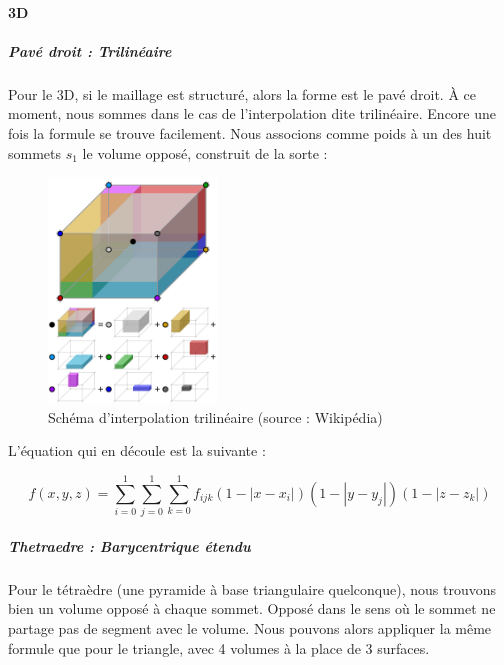 \paragraph{3D}
\subparagraph{Pavé droit : Trilinéaire}

Pour le 3D, si le maillage est structuré, alors la forme est le pavé droit. À ce moment, nous sommes dans le cas de l'interpolation dite trilinéaire. Encore une fois la formule se trouve facilement. Nous associons comme poids à un des huit sommets \( s_1 \) le volume opposé, construit de la sorte :

\begin{figure}[ht!]
    \centering
    \includegraphics[width=0.4\textwidth]{images/Trilinear_interpolation_visualisation.svg.png}
    \caption{Schéma d'interpolation trilinéaire (source : Wikipédia)} %
\end{figure}

L'équation qui en découle est la suivante :

\begin{equation}
    f(x, y, z) = \sum_{i=0}^{1} \sum_{j=0}^{1} \sum_{k=0}^{1} f_{ijk} (1 - |x - x_i|)(1 - |y - y_j|)(1 - |z - z_k|)
\end{equation}



\subparagraph{Thetraedre : Barycentrique étendu}

Pour le tétraèdre (une pyramide à base triangulaire quelconque), nous trouvons bien un volume opposé à chaque sommet. Opposé dans le sens où le sommet ne partage pas de segment avec le volume. Nous pouvons alors appliquer la même formule que pour le triangle, avec 4 volumes à la place de 3 surfaces.

